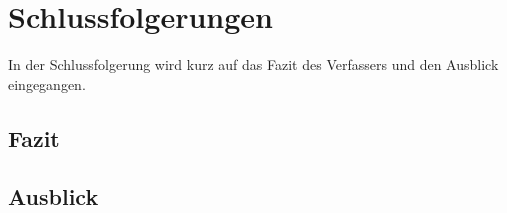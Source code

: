 %
%


\chapter{Schlussfolgerungen}\label{chap.Schlussfolgerungen}
In der Schlussfolgerung wird kurz auf das Fazit des Verfassers und den Ausblick eingegangen.

\section{Fazit}\label{fazit}

\section{Ausblick}\label{fazit_ausblick}